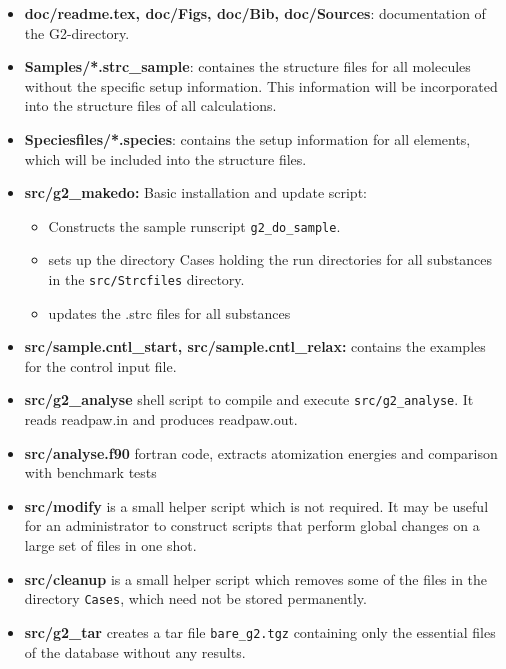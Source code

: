 \documentclass{book}
\begin{document}
\begin{itemize}
%
\item \textbf{doc/readme.tex, doc/Figs, doc/Bib, doc/Sources}: documentation of
  the G2-directory.  
%
\item \textbf{Samples/*.strc\_sample}: containes the structure files
  for all molecules without the specific setup information. This
  information will be incorporated into the structure files of all
  calculations.
%
\item \textbf{Speciesfiles/*.species}: contains the setup information
  for all elements, which will be included into the structure files.
%
\item \textbf{src/g2\_makedo:} Basic installation and update script:
  \begin{itemize}
     \item Constructs the sample runscript \verb+g2_do_sample+. 
     \item sets up the directory Cases holding the run directories for all
        substances in the \verb|src/Strcfiles| directory.
     \item updates the .strc files for all substances
    \end{itemize}
%
\item \textbf{src/sample.cntl\_start, src/sample.cntl\_relax:} 
    contains the examples for the control input file. 
%
\item \textbf{src/g2\_analyse} shell script to compile and execute
\verb|src/g2_analyse|. It reads readpaw.in and produces readpaw.out.
%
\item \textbf{src/analyse.f90} fortran code, extracts atomization
  energies and comparison with benchmark tests
%
\item \textbf{src/modify} is a small helper script which is not
  required. It may be useful for an administrator to construct scripts
  that perform global changes on a large set of files in one shot.
%
\item \textbf{src/cleanup} is a small helper script which removes some
  of the files in the directory \verb|Cases|, which need not be stored
  permanently.
%
\item \textbf{src/g2\_tar} creates a tar file \verb|bare_g2.tgz|
  containing only the essential files of the database without any
  results.
\end{itemize}

\end{document}
